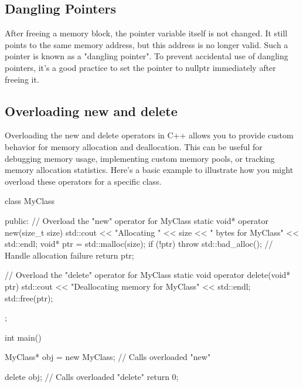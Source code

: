 \documentclass{report}
\begin{document}
    \bigbreak \noindent 
    \subsection{Dangling Pointers}
    \bigbreak \noindent 
    \begin{concept}
        After freeing a memory block, the pointer variable itself is not changed. It still points to the same memory address, but this address is no longer valid. Such a pointer is known as a "dangling pointer". To prevent accidental use of dangling pointers, it's a good practice to set the pointer to nullptr immediately after freeing it.
    \end{concept}

    \pagebreak 
    \subsection{Overloading new and delete}
    \bigbreak \noindent 
    \begin{concept}
        Overloading the new and delete operators in C++ allows you to provide custom behavior for memory allocation and deallocation. This can be useful for debugging memory usage, implementing custom memory pools, or tracking memory allocation statistics. Here's a basic example to illustrate how you might overload these operators for a specific class.
    \end{concept}
    \bigbreak \noindent 
    \begin{cppcode}
class MyClass {
public:
    // Overload the "new" operator for MyClass
    static void* operator new(size_t size) {
        std::cout << "Allocating " << size << " bytes for MyClass" << std::endl;
        void* ptr = std::malloc(size);
        if (!ptr) throw std::bad_alloc(); // Handle allocation failure
        return ptr;
    }

    // Overload the "delete" operator for MyClass
    static void operator delete(void* ptr) {
        std::cout << "Deallocating memory for MyClass" << std::endl;
        std::free(ptr);
    }
};

int main() {
    MyClass* obj = new MyClass; // Calls overloaded "new"

    delete obj; // Calls overloaded "delete"
    return 0;
}
    \end{cppcode}
    \bigbreak \noindent 
\end{document}
